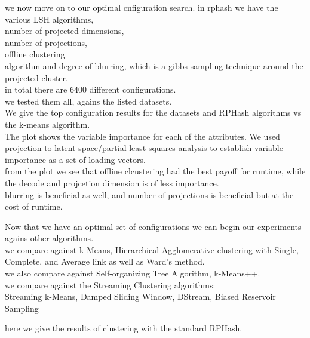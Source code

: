 \documentclass{beamer}
\begin{document}
\begin{frame}[plain]
we now move on to our optimal cnfiguration search. in rphash we have the various LSH
algorithms, \\
number of projected dimensions, \\
number of projections, \\
offline clustering\\
algorithm and degree of blurring, which is a gibbs sampling technique around the
projected cluster. \\
in total there are 6400 different configurations. \\
we tested
them all, agains the listed datasets.  \\
We give the top configuration results
for the datasets and RPHash algorithms vs the k-means algorithm. \\
The plot shows
the variable importance for each of the attributes. We used projection to latent
space/partial least squares analysis to establish variable importance as a set of
loading vectors. \\

from the plot we see that offline clcustering had the best payoff
for runtime, while the decode and projcetion dimension is of less importance.\\

blurring is beneficial as well, and number of projections is beneficial but at the
cost of runtime.
\end{frame}

\begin{frame}[plain]
Now that we have an optimal set of configurations we can begin our experiments
agains other algorithms.\\

we compare against k-Means, Hierarchical Agglomerative clustering with Single,
Complete, and Average link as well as Ward’s method.\\

we also compare against
Self-organizing Tree Algorithm, k-Means++.\\

we compare against the Streaming Clustering algorithms:\\

Streaming k-Means, Damped Sliding Window, DStream, Biased Reservoir Sampling
\end{frame}

\begin{frame}[plain]
here we give the results of clustering with the standard RPHash.
\end{frame}
\end{document}
